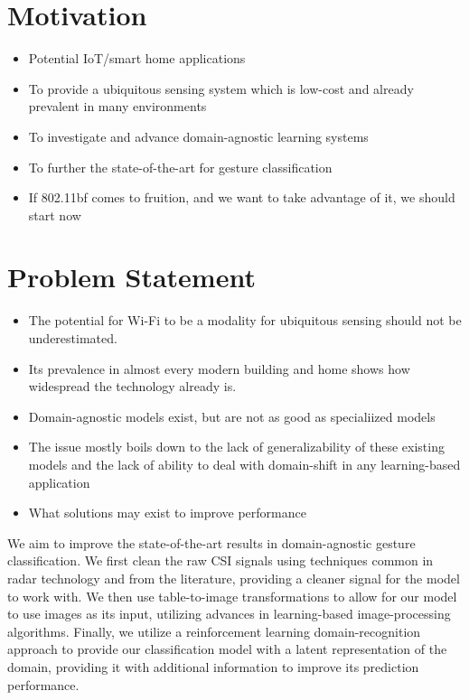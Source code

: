 \section{Motivation}\label{sec:intro-motivation}

\begin{itemize}
	\item Potential IoT/smart home applications
	\item To provide a ubiquitous sensing system which is low-cost and already prevalent in many environments
	\item To investigate and advance domain-agnostic learning systems
	\item To further the state-of-the-art for gesture classification
	\item If 802.11bf comes to fruition, and we want to take advantage of it, we should start now
\end{itemize}

\section{Problem Statement}\label{sec:intro-problem-statement}

\begin{itemize}
	\item The potential for Wi-Fi to be a modality for ubiquitous sensing should not be underestimated.
	\item Its prevalence in almost every modern building and home shows how widespread the technology already is.
	\item Domain-agnostic models exist, but are not as good as specialiized models
	\item The issue mostly boils down to the lack of generalizability of these existing models and the lack of ability to deal with domain-shift in any learning-based application
	\item What solutions may exist to improve performance
\end{itemize}

We aim to improve the state-of-the-art results in domain-agnostic gesture classification.
We first clean the raw CSI signals using techniques common in radar technology and from the literature, providing a cleaner signal for the model to work with.
We then use table-to-image transformations to allow for our model to use images as its input, utilizing advances in learning-based image-processing algorithms.
Finally, we utilize a reinforcement learning domain-recognition approach to provide our classification model with a latent representation of the domain, providing it with additional information to improve its prediction performance.


